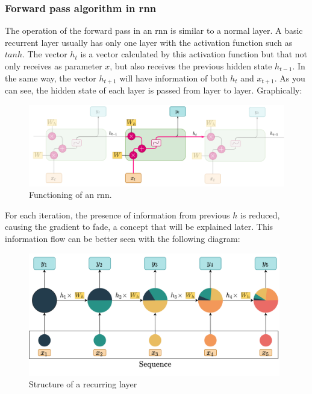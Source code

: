
\subsubsection{Forward pass algorithm in \acrshort{rnn}}

The operation of the forward pass in an \acrshort{rnn} is similar to a normal layer. A basic recurrent layer usually has only one layer with the activation function such as $tanh$. The vector $h_{t}$ is a vector calculated by this activation function but that not only receives as parameter $x$, but also receives the previous hidden state $h_{t-1}$. In the same way, the vector $h_{t+1}$ will have information of both $h_{t}$ and $x_{t+1}$. As you can see, the hidden state of each layer is passed from layer to layer. Graphically:


\begin{figure}[H]
    \centering
    \includegraphics[width=14cm]{images/state-of-art/rnn/standard-rnn.png}
    \caption{Functioning of an \acrshort{rnn}.}
\end{figure}

 For each iteration, the presence of information from previous $h$ is reduced, causing the gradient to fade, a concept that will be explained later. This information flow can be better seen with the following diagram:


\begin{figure}[H]
    \centering
    \includegraphics[width=11cm]{images/state-of-art/rnn/simple-rnn.png}
    \caption{Structure of a recurring layer}
    \label{fig:simple_rnn}
\end{figure}

